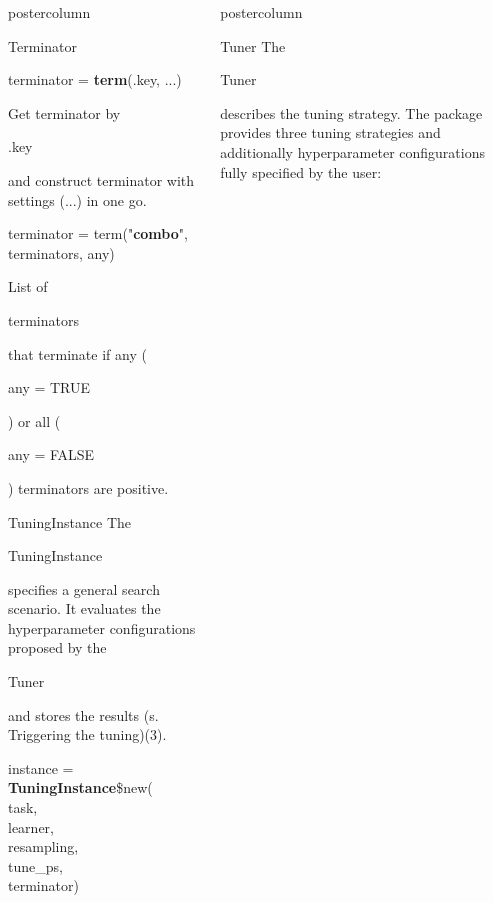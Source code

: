 \documentclass{beamer}
\newlength{\columnheight} %
\newcommand{\codeinline}[1]{\begin{codeboxinline}#1\end{codeboxinline}}
\begin{document}
\begin{frame}[fragile]{}
\begin{columns}
\begin{column}{.245\textwidth}
\begin{beamercolorbox}[center]{postercolumn}
\begin{minipage}{.98\textwidth}
{\begin{myblock}{Terminator}
							\begin{codebox}
								terminator = \textbf{term}(.key, ...)
							\end{codebox}
							Get terminator by \codeinline{.key} and construct terminator with settings (...) in one go.
							\\
							\begin{codebox}
								terminator = term("\textbf{combo}", terminators, any)
							\end{codebox}
							List of \codeinline{terminators} that terminate if any (\codeinline{any = TRUE}) or all (\codeinline{any = FALSE}) terminators are positive.
						\end{myblock}
						\begin{myblock}{TuningInstance}
							The \codeinline{TuningInstance} specifies a general search scenario. It evaluates the hyperparameter configurations proposed by the \codeinline{Tuner} and stores the results (s. Triggering the tuning)(3).
							\\
							\begin{codeboxmultiline}[width=20cm]
								instance = \textbf{TuningInstance}\$new(\\
								\hspace*{1ex}task,\\
								\hspace*{1ex}learner,\\
								\hspace*{1ex}resampling,\\
								\hspace*{1ex}tune\_ps,\\
								\hspace*{1ex}terminator)
							\end{codeboxmultiline}
						\end{myblock}
						\vfill}
				\end{minipage}
			\end{beamercolorbox}
		\end{column}
		\begin{column}{.245\textwidth}
			\begin{beamercolorbox}[center]{postercolumn}
				\begin{minipage}{.98\textwidth}
					\parbox[t][\columnheight]{\textwidth}{
						\begin{myblock}{Tuner}
							The \codeinline{Tuner} describes the tuning strategy. The package provides three tuning strategies and additionally hyperparameter configurations fully specified by the user:

\end{myblock}}
\end{minipage}
\end{beamercolorbox}
\end{column}
\end{columns}
\end{frame}
\end{document}
